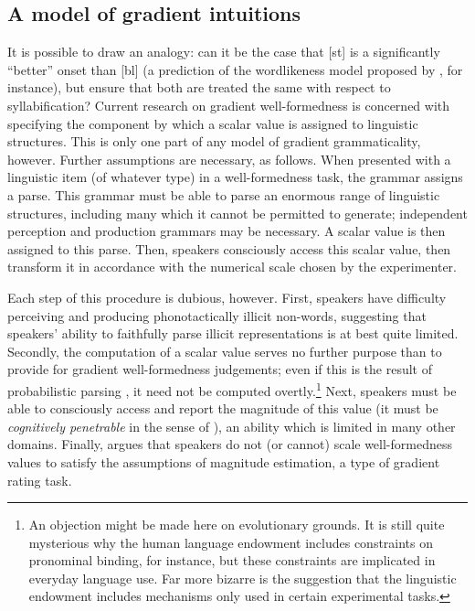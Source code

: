 \subsection{A model of gradient intuitions}

It is possible to draw an analogy: can it be the case that [st] is a significantly ``better'' onset than [bl] (a prediction of the wordlikeness model proposed by \citealt{Albright2009a}, for instance), but ensure that both are treated the same with respect to syllabification? 
Current research on gradient well-formedness is concerned with specifying the component by which a scalar value is assigned to linguistic structures. 
This is only one part of any model of gradient grammaticality, however.
Further assumptions are necessary, as follows.
When presented with a linguistic item (of whatever type) in a well-formedness task, the grammar assigns a parse.
This grammar must be able to parse an enormous range of linguistic structures, including many which it cannot be permitted to generate; independent perception and production grammars may be necessary. 
A scalar value is then assigned to this parse. 
Then, speakers consciously access this scalar value, then transform it in accordance with the numerical scale chosen by the experimenter.

Each step of this procedure is dubious, however.
First, speakers have difficulty perceiving \citep{Berent2007a,Brown1956,Dupoux1999,Kabak2007a} and producing \citep{Davidson2005,Davidson2006a,Davidson2006b,Davidson2010,GallagherInPress,Rose2007,Vitevitch1998,Vitevitch2005} phonotactically illicit non-words, suggesting that speakers' ability to faithfully parse illicit representations is at best quite limited.
Secondly, the computation of a scalar value serves no further purpose than to provide for gradient well-formedness judgements; even if this is the result of probabilistic parsing \citep[e.g.,][]{Coleman1997}, 
it need not be computed overtly.\footnote{
    An objection might be made here on evolutionary grounds. 
    It is still quite mysterious why the human language endowment includes constraints on pronominal binding, for instance, but these constraints are implicated in everyday language use.
    Far more bizarre is the suggestion that the linguistic endowment includes mechanisms only used in certain experimental tasks.}
Next, speakers must be able to consciously access and report the magnitude of this value (it must be \emph{cognitively penetrable} in the sense of \citealt{Pylyshyn1984}), an ability which is limited in many other domains.
Finally, \citet{Sprouse2011} argues that speakers do not (or cannot) scale well-formedness values to satisfy the assumptions of magnitude estimation, a type of gradient rating task.

